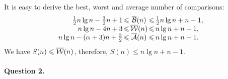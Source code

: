 It is easy to derive the best, worst and average number of
comparisons:
\[
\begin{array}{r@{\,}c@{\,}c@{\,}c@{\,}l}
  \frac{1}{2}{n\lg n} - \frac{3}{2}{n} + 1 & \leqslant & \Bcomp(n)
     & \leqslant & \frac{1}{2}{n \lg n} + n - 1,\\
  n\lg n - 4n + 3 & \leqslant & \Wcomp(n)
                  & \leqslant & n\lg n + n - 1,\\
  n\lg n - (\alpha + 3)n + \frac{3}{2} & \leqslant & \Acomp(n)
                             & \leqslant & n\lg n + n - 1.
\end{array}
\]
We have \(S(n) \leqslant \overline{\mathcal{W}}(n)\), therefore, \(S(n)
\leqslant n \lg n + n - 1\).

\medskip

\paragraph{Question 2.}

